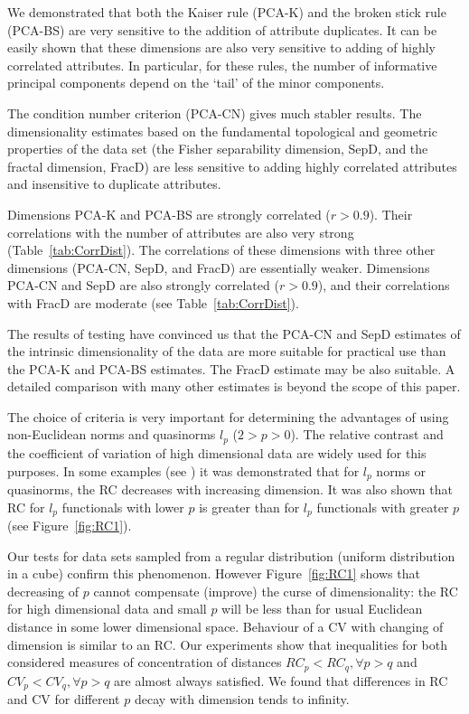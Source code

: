 \documentclass[entropy,article,submit,moreauthors,pdftex]{Definitions/mdpi}
\begin{document}
We demonstrated  that both the Kaiser rule (PCA-K) and the broken stick rule (PCA-BS) are very sensitive to the addition of attribute duplicates. It can be easily shown that these dimensions are also very sensitive to adding of highly correlated attributes. In particular, for these rules, the number of informative principal components depend  on the `tail' of the minor components.

The condition number criterion (PCA-CN) gives much stabler results. The dimensionality estimates  based on the fundamental topological and geometric properties of the data set (the Fisher separability dimension, SepD,  and the fractal dimension, FracD) are less sensitive to adding highly correlated attributes and insensitive to duplicate attributes.

Dimensions PCA-K and PCA-BS are strongly correlated ($r>0.9$). Their correlations with the number of attributes are also very strong (Table~\ref{tab:CorrDist}). The correlations of these dimensions with three other dimensions (PCA-CN, SepD, and FracD) are essentially weaker. Dimensions PCA-CN and SepD  are also strongly correlated ($r>0.9$), and their correlations with FracD are moderate (see Table~\ref{tab:CorrDist}).

The results of testing have convinced us that the PCA-CN and SepD estimates of the intrinsic dimensionality of the data are more suitable for practical use than the PCA-K and PCA-BS estimates. The  FracD estimate may be also suitable. A detailed comparison with many other estimates is beyond the scope of this paper.

The choice of criteria is very important for determining the advantages of using non-Euclidean norms and quasinorms $l_p$ ($2>p>0$). The relative contrast and the  coefficient of variation of high dimensional data are widely used for this purposes. In some examples (see \cite{hinneburg2000, aggarwal2001}) it was demonstrated that for $l_p$ norms or quasinorms, the RC decreases with increasing dimension. It was also  shown \cite{aggarwal2001} that RC for $l_p$ functionals with lower $p$  is greater than for $l_p$ functionals with greater $p$ (see Figure~\ref{fig:RC1}).

Our tests for data sets sampled from a regular distribution (uniform distribution in a cube) confirm  this phenomenon. However Figure~\ref{fig:RC1} shows that decreasing of $p$ cannot compensate (improve) the curse of dimensionality: the RC for high dimensional data and small $p$ will be less than for usual Euclidean distance in some lower dimensional space. Behaviour of a CV with changing of dimension is similar to an RC. Our experiments show that inequalities for both considered measures of concentration of distances $RC_p<RC_q, \forall p>q$ and $CV_p<CV_q, \forall p>q$ are almost always satisfied. We found that differences in RC and CV for different $p$ decay with dimension tends to infinity.
\end{document}
